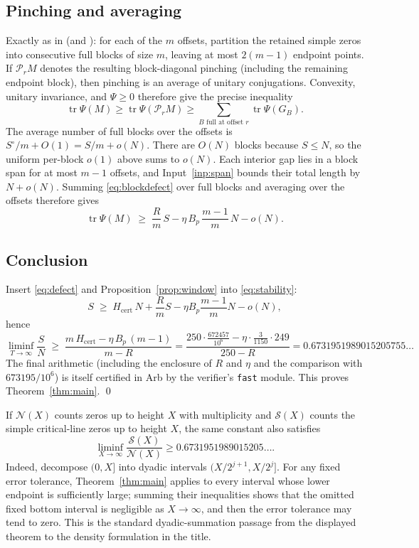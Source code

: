 \documentclass[11pt]{article}
\DeclareMathOperator{\tr}{tr}
\begin{document}
\subsection{Pinching and averaging}

Exactly as in \cite[\S5]{Ainta26} (and \cite[\S4]{Trmdy26}): for each of the
$m$ offsets, partition the retained simple zeros into consecutive full
blocks of size $m$, leaving at most $2(m-1)$ endpoint points.  If
$\mathcal P_rM$ denotes the resulting block-diagonal pinching (including the
remaining endpoint block), then pinching is an average of unitary
conjugations.  Convexity, unitary invariance, and $\Psi\ge0$ therefore give
the precise inequality
\[
 \tr\Psi(M)\ge\tr\Psi(\mathcal P_rM)
 \ge\sum_{B\text{ full at offset }r}\tr\Psi(G_B).
\]
The average number of full blocks over the offsets is
$S^\circ/m+O(1)=S/m+o(N)$.  There are $O(N)$ blocks because $S\le N$, so the
uniform per-block $o(1)$ above sums to $o(N)$.  Each interior gap lies in a
block span for at most $m-1$ offsets, and Input~\ref{inp:span} bounds their
total length by $N+o(N)$.  Summing \eqref{eq:blockdefect} over full blocks
and averaging over the offsets therefore gives
\begin{equation}\label{eq:defect}
 \tr\Psi(M)\;\ge\;\frac Rm\,S-\eta\,B_p\,\frac{m-1}{m}\,N-o(N).
\end{equation}

\subsection{Conclusion}

Insert \eqref{eq:defect} and Proposition~\ref{prop:window} into
\eqref{eq:stability}:
\[
 S\;\ge\;H_{\mathrm{cert}}\,N+\frac Rm S-\eta B_p\frac{m-1}{m}N-o(N),
\]
hence
\[
 \liminf_{T\to\infty}\frac SN
 \;\ge\;
 \frac{m\,H_{\mathrm{cert}}-\eta\,B_p\,(m-1)}{m-R}
 =\frac{250\cdot\frac{672457}{10^6}-\eta\cdot\frac{3}{1150}\cdot249}{250-R}
 =0.6731951989015205755\ldots
\]
The final arithmetic (including the enclosure of $R$ and $\eta$ and the
comparison with $673195/10^6$) is itself certified in Arb by the verifier's
\texttt{fast} module.  This proves Theorem~\ref{thm:main}. \qed

If $\mathcal N(X)$ counts zeros up to height $X$ with multiplicity and
$\mathcal S(X)$ counts the simple critical-line zeros up to height $X$, the
same constant also satisfies
\[
 \liminf_{X\to\infty}\frac{\mathcal S(X)}{\mathcal N(X)}
 \ge0.6731951989015205\ldots .
\]
Indeed, decompose $(0,X]$ into dyadic intervals
$(X/2^{j+1},X/2^j]$.  For any fixed error tolerance, Theorem~\ref{thm:main}
applies to every interval whose lower endpoint is sufficiently large; summing
their inequalities shows that the omitted fixed bottom interval is negligible
as $X\to\infty$, and then the error tolerance may tend to zero.  This is the
standard dyadic-summation passage from the
displayed theorem to the density formulation in the title.
\end{document}
